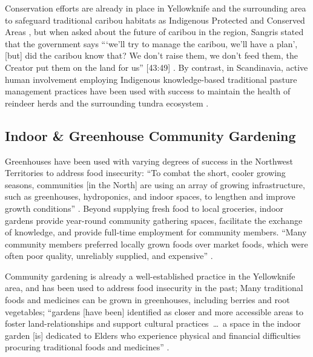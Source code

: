 \documentclass{report}
\begin{document}
\hspace{24pt} Conservation efforts are already in place in Yellowknife and the surrounding area to safeguard traditional caribou habitats as Indigenous Protected and Conserved Areas \parencite{resilientcommunities}, but when asked about the future of caribou in the region, Sangris stated that the government says ```we'll try to manage the caribou, we'll have a plan', [but] did the caribou know that? We don't raise them, we don't feed them, the Creator put them on the land for us'' [43:49] \parencite{jonassangris}.
By contrast, in Scandinavia, active human involvement employing Indigenous knowledge-based traditional pasture management practices have been used with success to maintain the health of reindeer herds and the surrounding tundra ecosystem \parencite{reindeerfoodsovereignty}.

\subsection{Indoor \& Greenhouse Community Gardening}

\hspace{24pt} Greenhouses have been used with varying degrees of success in the Northwest Territories to address food insecurity: ``To combat the short, cooler growing seasons, communities [in the North] are using an array of growing infrastructure, such as greenhouses, hydroponics, and indoor spaces, to lengthen and improve growth conditions'' \parencite[90]{resilientcommunities}. Beyond supplying fresh food to local groceries, indoor gardens provide year-round community gathering spaces, facilitate the exchange of knowledge, and provide full-time employment for community members. ``Many community members preferred locally grown foods over market foods, which were often poor quality, unreliably supplied, and expensive'' \parencite[99]{resilientcommunities}.

\hspace{24pt} Community gardening is already a well-established practice in the Yellowknife area, and has been used to address food insecurity in the past; Many traditional foods and medicines can be grown in greenhouses, including berries and root vegetables; ``gardens [have been] identified as closer and more accessible areas to foster land-relationships and support cultural practices~\ldots~a space in the indoor garden [is] dedicated to Elders who experience physical and financial difficulties procuring traditional foods and medicines'' \parencite[99]{resilientcommunities}.
\end{document}
